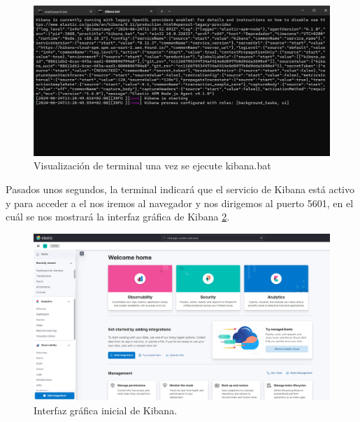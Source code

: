 \begin{figure}
    \centering
    \includegraphics[width=1\linewidth]{img/kibanaa1.png}
    \caption{Visualización de terminal una vez se ejecute kibana.bat}
    \label{fig:kibana1}
\end{figure}

Pasados unos segundos, la terminal indicará que el servicio de Kibana está activo y para acceder a el nos iremos al navegador y nos dirigemos al puerto 5601, en el cuál se nos mostrará la interfaz gráfica de Kibana \ref{fig:kibana2}.

\begin{figure}
    \centering
    \includegraphics[width=1\linewidth]{img/kibana2.png}
    \caption{Interfaz gráfica inicial de Kibana.}
    \label{fig:kibana2}
\end{figure}

\paragraph{}
\paragraph{}
